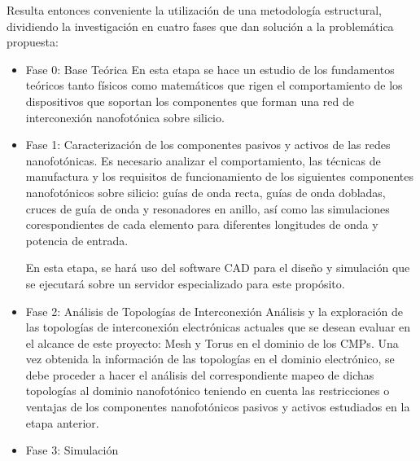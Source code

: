 Resulta entonces conveniente la utilización de una metodología estructural, 
dividiendo la investigación en cuatro fases que dan solución a la 
problemática propuesta:

\begin{itemize}
\item Fase 0: Base Teórica
En esta etapa se hace un estudio de los fundamentos teóricos tanto físicos
como matemáticos que rigen el comportamiento de los dispositivos que soportan
los componentes que forman una red de interconexión nanofotónica sobre silicio. 

\item Fase 1: Caracterización de los componentes pasivos y activos de las redes nanofotónicas. 
Es necesario analizar el comportamiento, las técnicas de manufactura y 
los requisitos de funcionamiento de los siguientes componentes nanofotónicos sobre 
silicio: guías de onda recta, guías de onda dobladas, cruces de guía de onda 
y resonadores en anillo, así como las simulaciones corespondientes de cada elemento 
para diferentes longitudes de onda y potencia de entrada.

En esta etapa, se hará uso del software CAD para el diseño y simulación que se ejecutará 
sobre un servidor especializado para este propósito. 

\item Fase 2: Análisis de Topologías de Interconexión
Análisis y la exploración de las topologías de interconexión electrónicas 
actuales que se desean evaluar en el alcance de este proyecto: Mesh y Torus 
en el dominio de los CMPs.
Una vez obtenida la información de las topologías en el dominio electrónico, 
se debe proceder a hacer el análisis del correspondiente mapeo de dichas topologías 
al dominio nanofotónico teniendo en cuenta las restricciones o 
ventajas de los componentes nanofotónicos pasivos y activos estudiados en la etapa
anterior. 

\item Fase 3: Simulación 

\end{itemize} 


